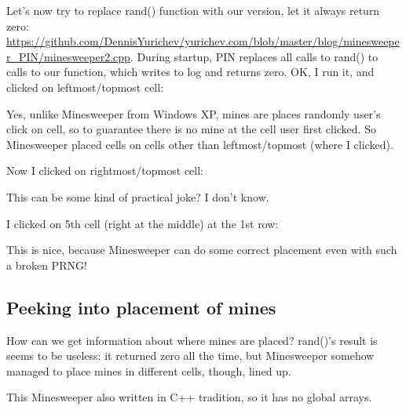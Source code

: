 Let's now try to replace rand() function with our version, let it always return zero: \url{https://github.com/DennisYurichev/yurichev.com/blob/master/blog/minesweeper_PIN/minesweeper2.cpp}.
During startup, PIN replaces all calls to rand() to calls to our function, which writes to log and returns zero.
OK, I run it, and clicked on leftmost/topmost cell:

\begin{figure}[H]
\centering
{}                                                                               
\end{figure}

Yes, unlike Minesweeper from Windows XP, mines are places randomly  user's click on cell, so to guarantee
there is no mine at the cell user first clicked.
So Minesweeper placed cells on cells other than leftmost/topmost (where I clicked).

Now I clicked on rightmost/topmost cell:

\begin{figure}[H]
\centering
{}                                                                               
\end{figure}

This can be some kind of practical joke? I don't know.

I clicked on 5th cell (right at the middle) at the 1st row:

\begin{figure}[H]
\centering
{}                                                                               
\end{figure}

This is nice, because Minesweeper can do some correct placement even with such a broken \ac{PRNG}!

\subsection{Peeking into placement of mines}

How can we get information about where mines are placed?
rand()'s result is seems to be useless: it returned zero all the time, but Minesweeper somehow managed to place
mines in different cells, though, lined up.

This Minesweeper also written in C++ tradition, so it has no global arrays.

